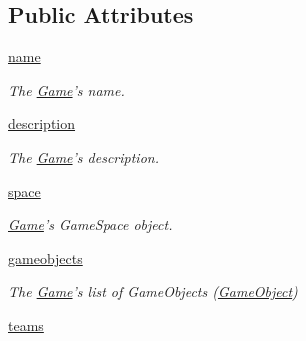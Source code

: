 \subsection*{\-Public \-Attributes}
\begin{DoxyCompactItemize}
\item 
\hypertarget{classGame_1_1Game_a22c0db7acba3af745d60b16b997e9439}{\hyperlink{classGame_1_1Game_a22c0db7acba3af745d60b16b997e9439}{name}}\label{classGame_1_1Game_a22c0db7acba3af745d60b16b997e9439}

\begin{DoxyCompactList}\small\item\em \-The \hyperlink{classGame_1_1Game}{\-Game}'s name. \end{DoxyCompactList}\item 
\hypertarget{classGame_1_1Game_acdc29dd60a3b80f3dd6d9c6a069e551d}{\hyperlink{classGame_1_1Game_acdc29dd60a3b80f3dd6d9c6a069e551d}{description}}\label{classGame_1_1Game_acdc29dd60a3b80f3dd6d9c6a069e551d}

\begin{DoxyCompactList}\small\item\em \-The \hyperlink{classGame_1_1Game}{\-Game}'s description. \end{DoxyCompactList}\item 
\hypertarget{classGame_1_1Game_a17f9756d1c7683b98d8c3b42b2cd42bd}{\hyperlink{classGame_1_1Game_a17f9756d1c7683b98d8c3b42b2cd42bd}{space}}\label{classGame_1_1Game_a17f9756d1c7683b98d8c3b42b2cd42bd}

\begin{DoxyCompactList}\small\item\em \hyperlink{classGame_1_1Game}{\-Game}'s \-Game\-Space object. \end{DoxyCompactList}\item 
\hypertarget{classGame_1_1Game_a5c4c51b255ba66dcbc0eb1c689e9f97d}{\hyperlink{classGame_1_1Game_a5c4c51b255ba66dcbc0eb1c689e9f97d}{gameobjects}}\label{classGame_1_1Game_a5c4c51b255ba66dcbc0eb1c689e9f97d}

\begin{DoxyCompactList}\small\item\em \-The \hyperlink{classGame_1_1Game}{\-Game}'s list of \-Game\-Objects (\hyperlink{namespaceGameObject}{\-Game\-Object}) \end{DoxyCompactList}\item 
\hypertarget{classGame_1_1Game_ac616645ae9beaf693c3be58daea72665}{\hyperlink{classGame_1_1Game_ac616645ae9beaf693c3be58daea72665}{teams}}\label{classGame_1_1Game_ac616645ae9beaf693c3be58daea72665}


\end{DoxyCompactItemize}
